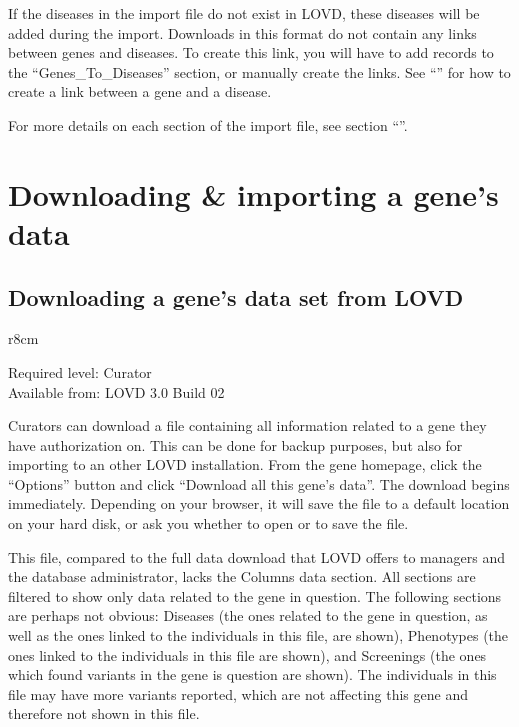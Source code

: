 If the diseases in the import file do not exist in LOVD, these diseases will be added during the import.
Downloads in this format do not contain any links between genes and diseases.
To create this link, you will have to add records to the ``Genes\_To\_Diseases'' section, or manually create the links.
See ``'' for how to create a link between a gene and a disease.

For more details on each section of the import file, see section
 ``''.
\clearpage





\hypertarget{sec:download_import_gene_data}{}
\section{Downloading \& importing a gene's data}



\hypertarget{ssec:download_gene_data}{}
\subsection{Downloading a gene's data set from LOVD}
\begin{wrapfigure}[3]{r}{8cm} %
  \vspace{-25pt}
  \begin{leftbar}
    Required level: Curator\\
    Available from: LOVD 3.0 Build 02
  \end{leftbar}
\end{wrapfigure}
Curators can download a file containing all information related to a gene they have authorization on.
This can be done for backup purposes, but also for importing to an other LOVD installation.
From the gene homepage, click the ``Options'' button and click ``Download all this gene's data''.
The download begins immediately.
Depending on your browser, it will save the file to a default location on your hard disk, or ask you whether
 to open or to save the file.

This file, compared to the full data download that LOVD offers to managers and the database administrator,
 lacks the Columns data section.
All sections are filtered to show only data related to the gene in question.
The following sections are perhaps not obvious:
 Diseases (the ones related to the gene in question, as well as the ones linked to the individuals in this
 file, are shown), Phenotypes (the ones linked to the individuals in this file are shown), and Screenings
 (the ones which found variants in the gene is question are shown).
The individuals in this file may have more variants reported, which are not affecting this gene and therefore
 not shown in this file.



